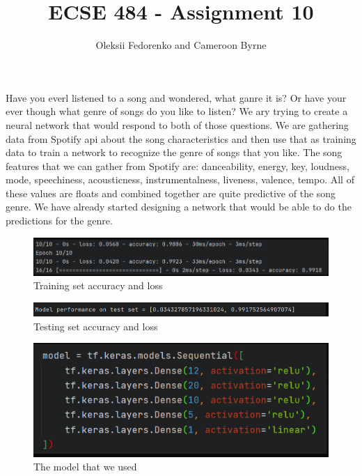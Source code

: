 \documentclass[12pt, oneside, a4paper]{article}
\begin{document}
 
    \title{\textbf{ECSE 484 - Assignment 10}}
    \author{Oleksii Fedorenko and Cameroon Byrne}
    \maketitle
    
    Have you everl listened to a song and wondered, what ganre it is? Or have your ever though what genre of songs do you like to listen? We ary trying to create a neural network that would respond to both of those questions. We are gathering data from Spotify api about the song characteristics and then use that as training data to train a network to recognize the genre of songs that you like. The song features that we can gather from Spotify are: danceability, energy, key, loudness, mode, speechiness, acousticness, instrumentalness, liveness, valence, tempo. All of these values are floats and combined together are quite predictive of the song genre. We have already started designing a network that would be able to do the predictions for the genre. 

    \FloatBarrier 
    \begin{figure}[H]
        \caption{Training set accuracy and loss} 
        \centerline{
        \includegraphics[width=\textwidth]{tarining_set_loss_acc.PNG}
        } 
    \end{figure}

    
    \FloatBarrier 
    \begin{figure}[H]
        \caption{Testing set accuracy and loss} 
        \centerline{
        \includegraphics[width=\textwidth]{test_set.PNG}
        } 
    \end{figure}
    
    \FloatBarrier 
    \begin{figure}[H]
        \caption{The model that we used} 
        \centerline{
        \includegraphics[width=\textwidth]{model.PNG}
        } 
    \end{figure}
\end{document}
